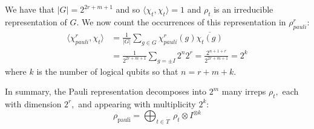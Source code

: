 \documentclass[a4paper,onecolumn,11pt,unpublished]{quantumarticle}
\def\C{\mathbb{C}}
\def\Pauli{\mathcal{P}}
\def\GL{\mathrm{GL}}
\def\Stab{S}
\begin{document}
We have that $|G|=2^{2r+m+1}$ and so
$\langle\chi_{t},\chi_{t}\rangle = 1$ and
$\rho_t$ is an irreducible representation of $G.$
We now count the occurrences of 
this representation in $\rho^r_{pauli}$:
\begin{align*}
\langle\chi^r_{pauli},\chi_{t}\rangle &= \frac{1}{|G|}\sum_{g\in G} \chi^r_{pauli}(g)\overline{\chi_{t}(g)} \\
&= \frac{1}{2^{2r+m+1}} \sum_{g=\pm I} 2^n 2^r = \frac{2^{n+1+r}}{2^{2r+m+1}} = 2^k
\end{align*}
where $k$ is the number of logical qubits so that $n=r+m+k.$

In summary, the Pauli representation decomposes into 
$2^m$ many irreps $\rho_t,$ 
each with dimension $2^r,$ 
and appearing with multiplicity $2^k:$
$$
    \rho_{\mathrm{pauli}} = 
        \bigoplus_{t\in T}\ \rho_t \otimes I^{\otimes k}
$$

%
%
\end{document}
